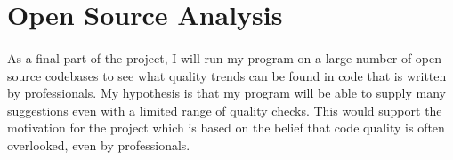 \documentclass{article}
\begin{document}
\section{Open Source Analysis}
\paragraph{} 
As a final part of the project, I will run my program on a large number of open-source codebases to see what quality trends can be found in code that is written by professionals. My hypothesis is that my program will be able to supply many suggestions even with a limited range of quality checks. This would support the motivation for the project which is based on the belief that code quality is often overlooked, even by professionals.
	
\end{document}
